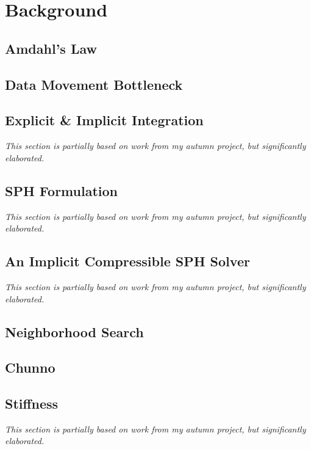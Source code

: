 \chapter{Background}
\label{chap:background}

\section{Amdahl's Law}
\label{sec:amdahl}

\section{Data Movement Bottleneck}
\label{sec:dops}

\section{Explicit \& Implicit Integration}
\label{sec:int}
\textit{This section is partially based on work from my autumn
project, but significantly elaborated.}

\section{SPH Formulation}
\label{sec:sph}
\textit{This section is partially based on work from my autumn
project, but significantly elaborated.}

\section{An Implicit Compressible SPH Solver}
\label{sec:icsph}
\textit{This section is partially based on work from my autumn
project, but significantly elaborated.}

\section{Neighborhood Search}
\label{sec:neigh}

\section{Chunno}
\label{sec:chunno}

\section{Stiffness}
\label{sec:stiffness}
\textit{This section is partially based on work from my autumn
project, but significantly elaborated.}

